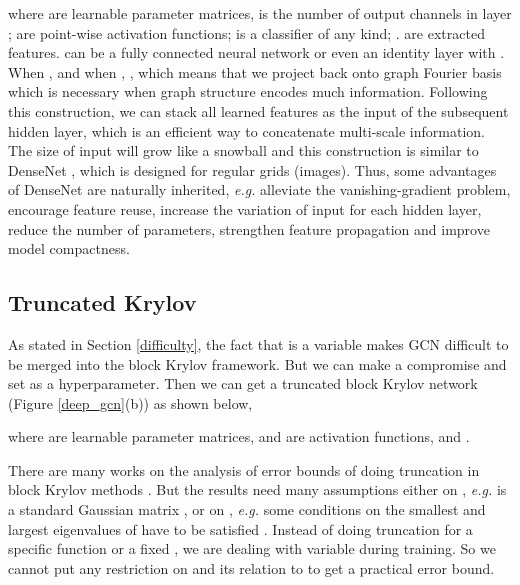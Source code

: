 \documentclass{article}
\newcommand\eg{\textit{e.g.}}
\begin{document}
where  are learnable parameter matrices,  is the number of output channels in layer ;  are point-wise activation functions;  is a classifier of any kind; .  are extracted features.  can be a fully connected neural network or even an identity layer with . When ,  and when , , which means that we project  back onto graph Fourier basis which is necessary when graph structure encodes much information. Following this construction, we can stack all learned features as the input of the subsequent hidden layer, which is an efficient way to concatenate multi-scale information. The size of input will grow like a snowball and this construction is similar to DenseNet \cite{huang2017densely}, which is designed for regular grids (images). Thus, some advantages of DenseNet are naturally inherited, \eg{} alleviate the vanishing-gradient problem, encourage feature reuse, increase the variation of input for each hidden layer, reduce the number of parameters, strengthen feature propagation and improve model compactness.

\subsection{Truncated Krylov}

As stated in Section \ref{difficulty}, the fact that  is a variable makes GCN difficult to be merged into the block Krylov framework. But we can make a compromise and set  as a hyperparameter. Then we can get a truncated block Krylov network (Figure \ref{deep_gcn}(b)) as shown below,

where  are learnable parameter matrices,  and  are activation functions, and .

There are many works on the analysis of error bounds of doing truncation in block Krylov methods \cite{frommer2017block}. But the results need many assumptions either on , \eg{}  is a standard Gaussian matrix \cite{ wang2015improved}, or on  , \eg{} some conditions on the smallest and largest eigenvalues of   have to be satisfied \cite{musco2018stability}. Instead of doing truncation for a specific function or a fixed , we are dealing with variable  during training. So we cannot put any restriction on  and its relation to  to get a practical error bound.

\begin{figure*}[htbp]
\centering
{}}
\hfill
\subfloat[Truncated Block Krylov]{
\captionsetup{justification = centering}
\texttt{[image: \{fig\_truncated\_krylov]}.pdf}}
\caption{Deep GCN Architectures}
\label{deep_gcn}
\end{figure*}
\end{document}
